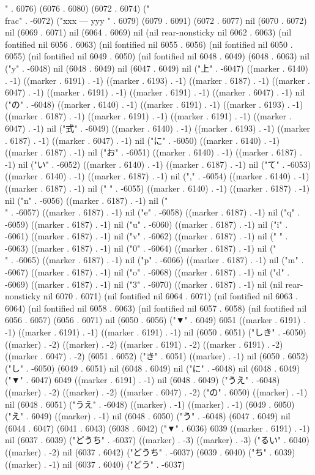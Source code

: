 " . 6076) (6076 . 6080) (6072 . 6074) ("\\frac" . -6072) ("xxx
---
yyy
" . 6079) (6079 . 6091) (6072 . 6077) nil (6070 . 6072) nil (6069 . 6071) nil (6064 . 6069) nil (nil rear-nonsticky nil 6062 . 6063) (nil fontified nil 6056 . 6063) (nil fontified nil 6055 . 6056) (nil fontified nil 6050 . 6055) (nil fontified nil 6049 . 6050) (nil fontified nil 6048 . 6049) (6048 . 6063) nil ("y" . -6048) nil (6048 . 6049) nil (6047 . 6049) nil ("上" . -6047) ((marker . 6140) . -1) ((marker . 6191) . -1) ((marker . 6193) . -1) ((marker . 6187) . -1) ((marker . 6047) . -1) ((marker . 6191) . -1) ((marker . 6191) . -1) ((marker . 6047) . -1) nil ("の" . -6048) ((marker . 6140) . -1) ((marker . 6191) . -1) ((marker . 6193) . -1) ((marker . 6187) . -1) ((marker . 6191) . -1) ((marker . 6191) . -1) ((marker . 6047) . -1) nil ("式" . -6049) ((marker . 6140) . -1) ((marker . 6193) . -1) ((marker . 6187) . -1) ((marker . 6047) . -1) nil ("に" . -6050) ((marker . 6140) . -1) ((marker . 6187) . -1) nil ("お" . -6051) ((marker . 6140) . -1) ((marker . 6187) . -1) nil ("い" . -6052) ((marker . 6140) . -1) ((marker . 6187) . -1) nil ("て" . -6053) ((marker . 6140) . -1) ((marker . 6187) . -1) nil ("," . -6054) ((marker . 6140) . -1) ((marker . 6187) . -1) nil (" " . -6055) ((marker . 6140) . -1) ((marker . 6187) . -1) nil ("n" . -6056) ((marker . 6187) . -1) nil ("\\" . -6057) ((marker . 6187) . -1) nil ("e" . -6058) ((marker . 6187) . -1) nil ("q" . -6059) ((marker . 6187) . -1) nil ("u" . -6060) ((marker . 6187) . -1) nil ("i" . -6061) ((marker . 6187) . -1) nil ("v" . -6062) ((marker . 6187) . -1) nil (" " . -6063) ((marker . 6187) . -1) nil ("0" . -6064) ((marker . 6187) . -1) nil ("\\" . -6065) ((marker . 6187) . -1) nil ("p" . -6066) ((marker . 6187) . -1) nil ("m" . -6067) ((marker . 6187) . -1) nil ("o" . -6068) ((marker . 6187) . -1) nil ("d" . -6069) ((marker . 6187) . -1) nil ("3" . -6070) ((marker . 6187) . -1) nil (nil rear-nonsticky nil 6070 . 6071) (nil fontified nil 6064 . 6071) (nil fontified nil 6063 . 6064) (nil fontified nil 6058 . 6063) (nil fontified nil 6057 . 6058) (nil fontified nil 6056 . 6057) (6056 . 6071) nil (6050 . 6056) ("▼" . 6049) 6051 ((marker . 6191) . -1) ((marker . 6191) . -1) ((marker . 6191) . -1) nil (6050 . 6051) ("しき" . -6050) ((marker) . -2) ((marker) . -2) ((marker . 6191) . -2) ((marker . 6191) . -2) ((marker . 6047) . -2) (6051 . 6052) ("き" . 6051) ((marker) . -1) nil (6050 . 6052) ("し" . -6050) (6049 . 6051) nil (6048 . 6049) nil ("に" . -6048) nil (6048 . 6049) ("▼" . 6047) 6049 ((marker . 6191) . -1) nil (6048 . 6049) ("うえ" . -6048) ((marker) . -2) ((marker) . -2) ((marker . 6047) . -2) ("の" . 6050) ((marker) . -1) nil (6048 . 6051) ("うえ" . -6048) ((marker) . -1) ((marker) . -1) (6049 . 6050) ("え" . 6049) ((marker) . -1) nil (6048 . 6050) ("う" . -6048) (6047 . 6049) nil (6044 . 6047) (6041 . 6043) (6038 . 6042) ("▼" . 6036) 6039 ((marker . 6191) . -1) nil (6037 . 6039) ("どうち" . -6037) ((marker) . -3) ((marker) . -3) ("るい" . 6040) ((marker) . -2) nil (6037 . 6042) ("どうち" . -6037) (6039 . 6040) ("ち" . 6039) ((marker) . -1) nil (6037 . 6040) ("どう" . -6037) 